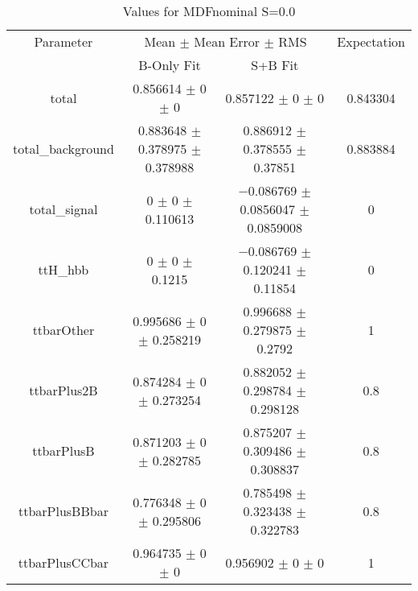 \begin{table}
\centering
\caption{Values for MDFnominal S=0.0}
\begin{tabular}{cccc}
\toprule
Parameter & \multicolumn{2}{c}{Mean $\pm$ Mean Error $\pm$ RMS} & Expectation\\
 & B-Only Fit & S+B Fit & \\
\midrule
total & \num{0.856614} $\pm$ \num{0} $\pm$ \num{0} & \num{0.857122} $\pm$ \num{0} $\pm$ \num{0} & \num{0.843304}\\
total\_background & \num{0.883648} $\pm$ \num{0.378975} $\pm$ \num{0.378988} & \num{0.886912} $\pm$ \num{0.378555} $\pm$ \num{0.37851} & \num{0.883884}\\
total\_signal & \num{0} $\pm$ \num{0} $\pm$ \num{0.110613} & \num{-0.086769} $\pm$ \num{0.0856047} $\pm$ \num{0.0859008} & \num{0}\\
ttH\_hbb & \num{0} $\pm$ \num{0} $\pm$ \num{0.1215} & \num{-0.086769} $\pm$ \num{0.120241} $\pm$ \num{0.11854} & \num{0}\\
ttbarOther & \num{0.995686} $\pm$ \num{0} $\pm$ \num{0.258219} & \num{0.996688} $\pm$ \num{0.279875} $\pm$ \num{0.2792} & \num{1}\\
ttbarPlus2B & \num{0.874284} $\pm$ \num{0} $\pm$ \num{0.273254} & \num{0.882052} $\pm$ \num{0.298784} $\pm$ \num{0.298128} & \num{0.8}\\
ttbarPlusB & \num{0.871203} $\pm$ \num{0} $\pm$ \num{0.282785} & \num{0.875207} $\pm$ \num{0.309486} $\pm$ \num{0.308837} & \num{0.8}\\
ttbarPlusBBbar & \num{0.776348} $\pm$ \num{0} $\pm$ \num{0.295806} & \num{0.785498} $\pm$ \num{0.323438} $\pm$ \num{0.322783} & \num{0.8}\\
ttbarPlusCCbar & \num{0.964735} $\pm$ \num{0} $\pm$ \num{0} & \num{0.956902} $\pm$ \num{0} $\pm$ \num{0} & \num{1}\\
\bottomrule
\end{tabular}
\end{table}